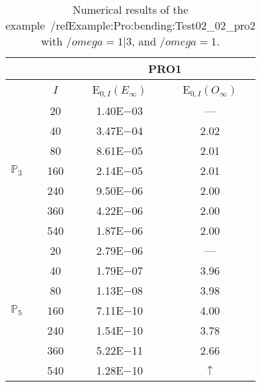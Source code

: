 \begin{table}[H]
\caption{Numerical results of the example~/ref{Example:Pro:bending:Test02_02_pro2} with $/omega=1|3$, and $/omega=1$.}
\setlength{\tabcolsep}{5pt}
\centering
\begin{tabular}{@{}l c c c@{}}
\toprule
 &  & \multicolumn{2}{c}{PRO1}\\
\midrule
 & $I$ & E$_{0,I}(E_{\infty})$ & E$_{0,I}(O_{\infty})$\\
\midrule
\multirow{7}{*}{$\mathbb{P}_{3}$}
 & 20 & 1.40E$-$03 & ---\\
 & 40 & 3.47E$-$04 & 2.02\\
 & 80 & 8.61E$-$05 & 2.01\\
 & 160 & 2.14E$-$05 & 2.01\\
 & 240 & 9.50E$-$06 & 2.00\\
 & 360 & 4.22E$-$06 & 2.00\\
 & 540 & 1.87E$-$06 & 2.00\\
\midrule
\multirow{7}{*}{$\mathbb{P}_{5}$}
 & 20 & 2.79E$-$06 & ---\\
 & 40 & 1.79E$-$07 & 3.96\\
 & 80 & 1.13E$-$08 & 3.98\\
 & 160 & 7.11E$-$10 & 4.00\\
 & 240 & 1.54E$-$10 & 3.78\\
 & 360 & 5.22E$-$11 & 2.66\\
 & 540 & 1.28E$-$10 & $\uparrow$\\
\bottomrule
\end{tabular}
\label{Table:PRO:test_02_02_test6_pro2}
\end{table}

